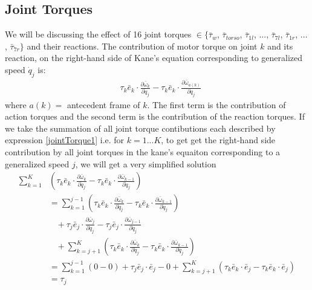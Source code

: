 \documentclass[a4paper,10pt]{article}
\begin{document}
\subsection{Joint Torques}
We will be discussing the effect of 16 joint torques $\in \{ \bar\tau_{w}$, $ \bar\tau_{torso}$, $ \bar\tau_{1l}$, $ ... $, $ \bar\tau_{7l}$, $ \bar\tau_{1r}$, $ ... $, $ \bar\tau_{7r} \}$ and their reactions.
The contribution of motor torque on joint $k$ and its reaction, on the right-hand side of Kane's equation corresponding to generalized speed $\dot{q}_j$ is: 
\begin{align}
 &\tau_k\bar{e}_k \cdot \frac{\partial \bar\omega_k}{\partial \dot{q}_j} - \tau_k\bar{e}_k \cdot \frac{\partial \bar\omega_{a(k)}}{\partial \dot{q}_j} \label{jointTorque1}
\end{align}
where $a(k) =$ antecedent frame of $k$. The first term is the contribution of action torques and the second term is the contribution
of the reaction torques.
If we take the summation of all joint torque contibutions each described by expression \ref{jointTorque1} i.e. for $k=1...K$, 
to get get the right-hand side contribution by all joint torques in the kane's equaiton corresponding to a generalized speed $j$, 
we will get a very simplified solution
\begin{align}
  \sum\limits_{k=1}^K &\left( \tau_k\bar{e}_k \cdot \frac{\partial \bar\omega_k}{\partial \dot{q}_j} - \tau_k\bar{e}_k \cdot \frac{\partial \bar\omega_{k-1}}{\partial \dot{q}_j} \right) \nonumber \\   
 &= \sum\limits_{k=1}^{j-1} \left(          \tau_k\bar{e}_k \cdot \frac{\partial \bar\omega_k}{\partial \dot{q}_j} - \tau_k\bar{e}_k \cdot \frac{\partial \bar\omega_{k-1}}{\partial \dot{q}_j}\right) \nonumber \\
      &\;\;\;+                              \tau_j\bar{e}_j \cdot \frac{\partial \bar\omega_j}{\partial \dot{q}_j} - \tau_j\bar{e}_j \cdot \frac{\partial \bar\omega_{j-1}}{\partial \dot{q}_j} \nonumber \\
      &\;\;\;+ \sum\limits_{k=j+1}^K \left( \tau_k\bar{e}_k \cdot \frac{\partial \bar\omega_k}{\partial \dot{q}_j} - \tau_k\bar{e}_k \cdot \frac{\partial \bar\omega_{k-1}}{\partial \dot{q}_j} \right) \nonumber \\
 &= \sum\limits_{k=1}^{j-1} \left(   0 - 0 \right) + \tau_j\bar{e}_j \cdot \bar{e}_j - 0 + \sum\limits_{k=j+1}^K \left( \tau_k\bar{e}_k \cdot \bar{e}_j - \tau_k\bar{e}_k \cdot \bar{e}_j \right) \nonumber \\
 &= \tau_j \label{jointTorque2}
\end{align}
\end{document}
